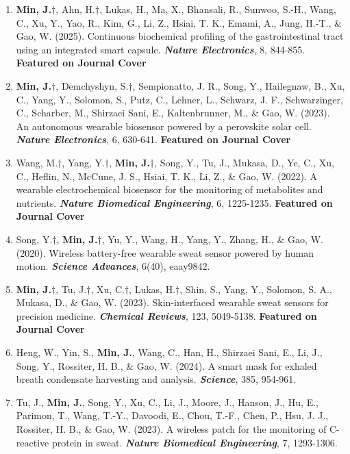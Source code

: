 \documentclass[11pt,a4paper]{article}
\begin{document}
\begin{enumerate}[leftmargin=*, itemsep=2pt, parsep=0pt, topsep=2pt]
  \item \textbf{Min, J.}$\dagger$, Ahn, H.$\dagger$, Lukas, H., Ma, X., Bhansali, R., Sunwoo, S.-H., Wang, C., Xu, Y., Yao, R., Kim, G., Li, Z., Hsiai, T. K., Emami, A., Jung, H.-T., \& Gao, W. (2025). Continuous biochemical profiling of the gastrointestinal tract using an integrated smart capsule. \textbf{\textit{Nature Electronics}}, 8, 844-855. \textbf{Featured on Journal Cover}
  \item \textbf{Min, J.}$\dagger$, Demchyshyn, S.$\dagger$, Sempionatto, J. R., Song, Y., Hailegnaw, B., Xu, C., Yang, Y., Solomon, S., Putz, C., Lehner, L., Schwarz, J. F., Schwarzinger, C., Scharber, M., Shirzaei Sani, E., Kaltenbrunner, M., \& Gao, W. (2023). An autonomous wearable biosensor powered by a perovskite solar cell. \textbf{\textit{Nature Electronics}}, 6, 630-641. \textbf{Featured on Journal Cover}
  \item Wang, M.$\dagger$, Yang, Y.$\dagger$, \textbf{Min, J.}$\dagger$, Song, Y., Tu, J., Mukasa, D., Ye, C., Xu, C., Heflin, N., McCune, J. S., Hsiai, T. K., Li, Z., \& Gao, W. (2022). A wearable electrochemical biosensor for the monitoring of metabolites and nutrients. \textbf{\textit{Nature Biomedical Engineering}}, 6, 1225-1235. \textbf{Featured on Journal Cover}
  \item Song, Y.$\dagger$, \textbf{Min, J.}$\dagger$, Yu, Y., Wang, H., Yang, Y., Zhang, H., \& Gao, W. (2020). Wireless battery-free wearable sweat sensor powered by human motion. \textbf{\textit{Science Advances}}, 6(40), eaay9842.
  \item \textbf{Min, J.}$\dagger$, Tu, J.$\dagger$, Xu, C.$\dagger$, Lukas, H.$\dagger$, Shin, S., Yang, Y., Solomon, S. A., Mukasa, D., \& Gao, W. (2023). Skin-interfaced wearable sweat sensors for precision medicine. \textbf{\textit{Chemical Reviews}}, 123, 5049-5138. \textbf{Featured on Journal Cover}
  \item Heng, W., Yin, S., \textbf{Min, J.}, Wang, C., Han, H., Shirzaei Sani, E., Li, J., Song, Y., Rossiter, H. B., \& Gao, W. (2024). A smart mask for exhaled breath condensate harvesting and analysis. \textbf{\textit{Science}}, 385, 954-961.
  \item Tu, J., \textbf{Min, J.}, Song, Y., Xu, C., Li, J., Moore, J., Hanson, J., Hu, E., Parimon, T., Wang, T.-Y., Davoodi, E., Chou, T.-F., Chen, P., Hsu, J. J., Rossiter, H. B., \& Gao, W. (2023). A wireless patch for the monitoring of C-reactive protein in sweat. \textbf{\textit{Nature Biomedical Engineering}}, 7, 1293-1306.

\end{enumerate}
\end{document}
